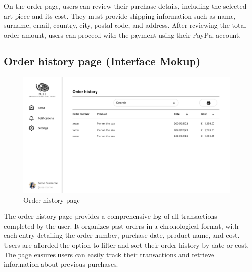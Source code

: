 On the order page, users can review their purchase details, including the selected art piece and its cost. They must provide shipping information such as name, surname, email, country, city, postal code, and address. After reviewing the total order amount, users can proceed with the payment using their PayPal account.

\subsection{Order history page (Interface Mokup)}
\begin{figure}[H]
    \centering
    \includegraphics[width=\myfigwidth]{images/interface_mockups/Order History.pdf}
    \caption{Order history page}
\end{figure}

The order history page provides a comprehensive log of all transactions completed by the user. It organizes past orders in a chronological format, with each entry detailing the order number, purchase date, product name, and cost. Users are afforded the option to filter and sort their order history by date or cost. 
The page ensures users can easily track their transactions and retrieve information about previous purchases.